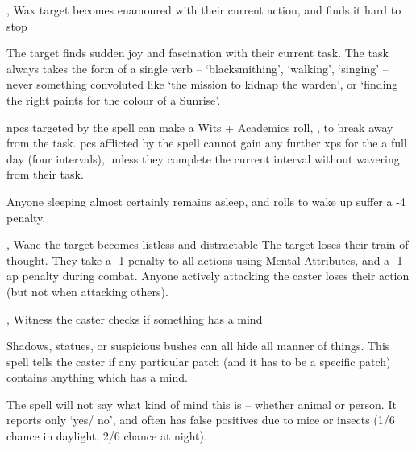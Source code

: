   {\mFate, \mWater}%
  {Wax}%
  {}%
  {}%
  {target becomes enamoured with their current action, and finds it hard to stop}%
  {
    The target finds sudden joy and fascination with their current task.
    The task always takes the form of a single verb -- `blacksmithing', `walking', `singing' -- never something convoluted like `the mission to kidnap the warden', or `finding the right paints for the colour of a Sunrise'.

    \Glspl{npc} targeted by the spell can make a Wits + Academics roll, \tn[8], to break away from the task.
    \Glspl{pc} afflicted by the spell cannot gain any further \glspl{xp} for the a full day (four \glspl{interval}), unless they complete the current \gls{interval} without wavering from their task.

  Anyone sleeping almost certainly remains asleep, and rolls to wake up suffer a -4 penalty.
  }

  {\mFate, \mWater}%
  {Wane}%
  {}%
  {}%
  {the target becomes listless and distractable}%
  {
    The target loses their train of thought.
    They take a -1 penalty to all actions using Mental Attributes, and a -1 \gls{ap} penalty during combat.
    Anyone actively attacking the caster loses their action (but not when attacking others).
  }

  {\mFate, \mWater}%
  {Witness}%
  {}%
  {}%
  {the caster checks if something has a mind}%
  {
    Shadows, statues, or suspicious bushes can all hide all manner of things.
    This spell tells the caster if any particular patch (and it has to be a specific patch) contains anything which has a mind.

    The spell will not say what kind of mind this is -- whether animal or person.
    It reports only `yes/ no', and often has false positives due to mice or insects (1/6 chance in daylight, 2/6 chance at night).
  }

